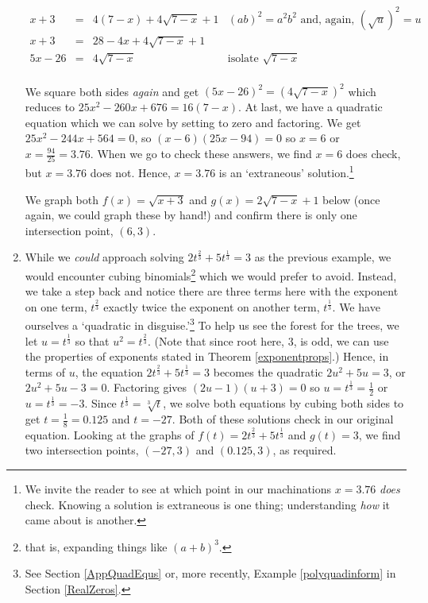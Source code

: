 \documentclass{ximera}
\begin{document}
\begin{example}
\begin{enumerate}
\[\begin{array}{rclr}
 
 x+3 & = & 4(7-x) + 4\sqrt{7-x} + 1 &  \text{$(ab)^2 = a^2b^2$ and, again, $(\sqrt{u})^2 = u$} \\
 
 x+3 & = & 28-4x+4\sqrt{7-x} + 1 & \\
 
 5x-26 & = & 4\sqrt{7-x} & \text{isolate $\sqrt{7-x}$} \\ \end{array} \]
 
We square both sides \textit{again} and get $(5x-26)^2 = (4\sqrt{7-x})^2$ which reduces to $25x^2-260x+676 = 16(7-x)$. At last, we have a quadratic equation which we can solve by setting to zero and factoring.  We get  $25x^2-244x+564 = 0$, so $(x-6)(25x-94) = 0$ so $x = 6$ or $x = \frac{94}{25} = 3.76$.  When we go to check these answers, we find $x=6$ does check, but $x = 3.76$ does not. Hence, $x=3.76$ is an `extraneous' solution.\footnote{We invite the reader to see at which point in our machinations $x=3.76$ \textit{does} check.  Knowing a solution is extraneous is one thing;  understanding \textit{how} it came about is another.}

We graph both $f(x) = \sqrt{x+3}$ and $g(x) = 2\sqrt{7-x} + 1$ below (once again, we could graph these by hand!) and confirm there is only one intersection point, $(6,3)$.

\item  While we \textit{could} approach solving  $2t^{\frac{2}{3}} + 5t^{\frac{1}{3}} = 3$ as the previous example, we would encounter cubing binomials\footnote{that is, expanding things like $(a+b)^3$.} which we would prefer to avoid.  Instead, we take a step back and notice there are three terms here with the exponent on one term, $t^{\frac{2}{3}}$ exactly twice the exponent on another term, $t^{\frac{1}{3}}$.  We have ourselves a `quadratic in disguise.'\footnote{See Section \ref{AppQuadEqus} or, more recently, Example \ref{polyquadinform} in Section \ref{RealZeros}.} To help us see the forest for the trees, we let $u = t^{\frac{1}{3}}$ so that $u^2 = t^{\frac{2}{3}}$. (Note that since root here, $3$, is odd, we can use the properties of exponents stated in Theorem \ref{exponentprops}.)  Hence, in terms of $u$, the equation   $2t^{\frac{2}{3}} + 5t^{\frac{1}{3}} = 3$ becomes the quadratic $2u^2 + 5u = 3$, or $2u^2 + 5u - 3 = 0$.  Factoring gives $(2u-1)(u+3) = 0$ so $u = t^{\frac{1}{3}} = \frac{1}{2}$ or $u = t^{\frac{1}{3}} = -3$.  Since $t^{\frac{1}{3}} = \sqrt[3]{t}$, we solve both equations by cubing both sides to get $t = \frac{1}{8} = 0.125$ and $t = -27$.  Both of these solutions check in our original equation.  Looking at the graphs of $f(t) = 2t^{\frac{2}{3}} + 5t^{\frac{1}{3}}$ and $g(t) = 3$, we find two intersection points, $(-27,3)$ and $(0.125,3)$, as required.


\end{enumerate}
\end{example}
\end{document}
